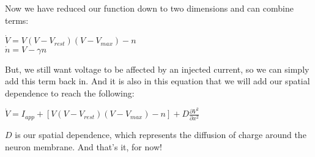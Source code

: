 \documentclass[12pt]{amsart}
\begin{document}
Now we have reduced our function down to two dimensions and can combine terms: 

\bigskip

\begin{center}

    $\dot{V} = V(V - V_{rest})(V - V_{max}) - n$\\
    $\dot{n} = V - \gamma n$
    
\end{center}

\bigskip

But, we still want voltage to be affected by an injected current, so we can simply add this term back in. And it is also in this equation that we will add our spatial dependence to reach the following: 

\bigskip

\begin{center}

    $\dot{V} = I_{app} + [V(V - V_{rest})(V - V_{max}) - n] +  D\frac{\partial V^2}{\partial x^2}$\\
    
\end{center}

\bigskip

$D$ is our spatial dependence, which represents the diffusion of charge around the neuron membrane. And that's it, for now! 
\end{document}

